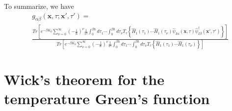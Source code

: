 To summarize, we have
\begin{equation}\label{4.2.A}
\begin{aligned}
&g_{\alpha\beta}(\mathbf{x},\tau;\mathbf{x'},\tau')=\\
&\frac{Tr\left[e^{-\beta K_0} \sum\limits_{\nu=0}^{\infty}\left(-\frac{1}{\hbar}\right)^{\nu}\frac{1}{\nu!}\int_{0}^{\beta\hbar}d\tau_1 \cdots \int_{0}^{\beta\hbar}d\tau_\nu T_\tau \left\{\hat{H}_1(\tau_1) \cdots \hat{H}_1(\tau_\nu)\hat{\psi}_{I\alpha}(\mathbf{x},\tau) \hat{\psi}_{I\beta}^{\dagger}(\mathbf{x'},\tau')\right\}\right]}
{Tr\left[e^{-\beta K_0}\sum\limits_{\nu=0}^{\infty}\left(-\frac{1}{\hbar}\right)^{\nu}\frac{1}{\nu!}\int_{0}^{\beta\hbar}d\tau_1 \cdots \int_{0}^{\beta\hbar}d\tau_\nu T_\tau \left\{\hat{H}_1(\tau_1) \cdots \hat{H}_1(\tau_\nu)\right\}\right]}
\end{aligned}
\end{equation}

\section{Wick's theorem for the temperature Green's function}

